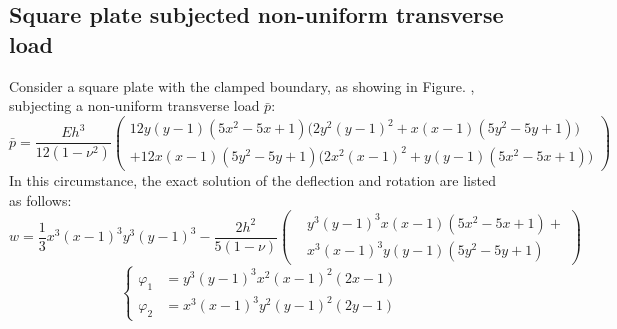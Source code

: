 \subsection{Square plate subjected non-uniform transverse load}
Consider a square plate with the clamped boundary, as showing in Figure. , subjecting a non-uniform transverse load $\bar p$:
\begin{equation}
\bar p = \frac{Eh^{3}}{12(1-\nu^{2})}\left(
    \begin{aligned}
        12y(y-1)(5x^{2}-5x+1)\bigl(2y^{2}(y-1)^{2}+x(x-1)(5y^{2}-5y+1)\bigr) \\ +12x(x-1)(5y^{2}-5y+1)\bigl(2x^{2}(x-1)^{2}+y(y-1)(5x^{2}-5x+1)\bigr)
    \end{aligned}
\right)
\end{equation}
In this circumstance, the exact solution of the deflection and rotation are listed as follows:
\begin{equation}
w = \frac{1}{3}x^{3}(x-1)^{3}y^{3}(y-1)^{3} - \frac{2h^{2}}{5(1-\nu)}
\left(
\begin{aligned}
&y^{3}(y-1)^{3}x(x-1)(5x^{2}-5x+1) + \\ 
&x^{3}(x-1)^{3}y(y-1)(5y^{2}-5y+1)
\end{aligned}
\right)
\end{equation}
\begin{equation}
\left\{
\begin{aligned}
\varphi_{1} &= y^{3}(y-1)^{3}x^{2}(x-1)^{2}(2x-1) \\
\varphi_{2} &= x^{3}(x-1)^{3}y^{2}(y-1)^{2}(2y-1)
\end{aligned}
\right .
\end{equation}